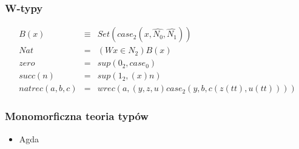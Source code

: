 \documentclass{beamer}
\begin{document}

\begin{frame}
\frametitle{W-typy}

\begin{eqnarray*}
B(x) &\equiv& Set(case_2(x, \hat{N_0}, \hat{N_1})) \\
Nat           &=& (Wx \in N_2) B(x) \\
zero          &=& sup(0_2, case_0) \\
succ(n)       &=& sup(1_2, (x) n) \\
natrec(a,b,c) &=& wrec(a, (y,z,u)case_2(y, b, c(z(tt), u(tt))))
\end{eqnarray*}

\end{frame}



\begin{frame}
\frametitle{Monomorficzna teoria typów}

\begin{itemize}
 \item Agda	
\end{itemize}

\end{frame}

\end{document}
